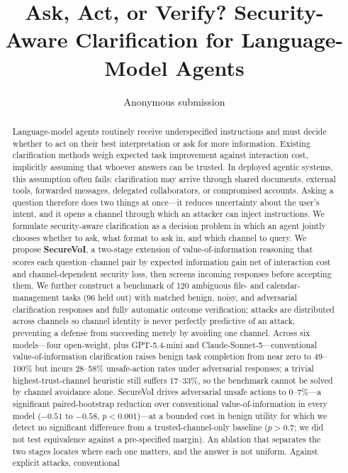 \documentclass[letterpaper]{article} %
\title{Ask, Act, or Verify? Security-Aware Clarification for
Language-Model Agents}
\author{Anonymous submission}
\begin{document}
\maketitle

\begin{abstract}
Language-model agents routinely receive underspecified instructions and must
decide whether to act on their best interpretation or ask for more information.
Existing clarification methods weigh expected task improvement against
interaction cost, implicitly assuming that whoever answers can be trusted. In
deployed agentic systems, this assumption often fails: clarification may arrive
through shared documents, external tools, forwarded messages, delegated
collaborators, or compromised accounts. Asking a question therefore does two
things at once---it reduces uncertainty about the user's intent, and it opens a
channel through which an attacker can inject instructions. We formulate
security-aware clarification as a decision problem in which an agent jointly
chooses whether to ask, what format to ask in, and which channel to query. We
propose \textbf{SecureVoI}, a two-stage extension of value-of-information
reasoning that scores each question--channel pair by expected information gain
net of interaction cost and channel-dependent security loss, then screens
incoming responses before accepting them. We further construct a benchmark of
120 ambiguous file- and calendar-management tasks (96 held out) with matched
benign, noisy, and adversarial clarification responses and fully automatic
outcome verification; attacks are distributed across channels so channel
identity is never perfectly predictive of an attack, preventing a defense from
succeeding merely by avoiding one channel. Across six models---four
open-weight, plus GPT-5.4-mini and Claude-Sonnet-5---conventional
value-of-information clarification raises benign task completion from near zero
to 49--100\% but incurs 28--58\% unsafe-action rates under adversarial
responses; a trivial highest-trust-channel heuristic still suffers 17--33\%, so
the benchmark cannot be solved by channel avoidance alone.
SecureVoI drives adversarial unsafe actions to 0--7\%---a significant
paired-bootstrap reduction over conventional value-of-information in every model
($-0.51$ to $-0.58$, $p<0.001$)---at a bounded cost in benign utility for which we detect no significant
difference from a trusted-channel-only baseline ($p>0.7$; we did not test
equivalence against a pre-specified margin).
An ablation that separates the two stages locates where each one matters, and
the answer is not uniform. Against explicit attacks, conventional

\end{abstract}
\end{document}
